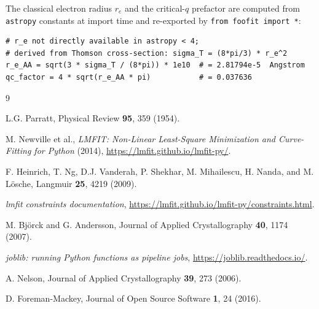 \documentclass[11pt,a4paper]{article}
\begin{document}
The classical electron radius $r_e$ and the critical-$q$ prefactor are computed from
\texttt{astropy} constants at import time and re-exported by \texttt{from foofit import *}:

\begin{verbatim}
# r_e not directly available in astropy < 4;
# derived from Thomson cross-section: sigma_T = (8*pi/3) * r_e^2
r_e_AA = sqrt(3 * sigma_T / (8*pi)) * 1e10  # = 2.81794e-5  Angstrom
qc_factor = 4 * sqrt(r_e_AA * pi)           # = 0.037636
\end{verbatim}

\begin{thebibliography}{9}

  L.G. Parratt,
  Physical Review \textbf{95}, 359 (1954).

  M. Newville et al.,
  \textit{LMFIT: Non-Linear Least-Square Minimization and Curve-Fitting for Python} (2014),
  \url{https://lmfit.github.io/lmfit-py/}.

  F. Heinrich, T. Ng, D.J. Vanderah, P. Shekhar, M. Mihailescu, H. Nanda, and M. L\"osche,
  Langmuir \textbf{25}, 4219 (2009).

  \textit{lmfit constraints documentation},
  \url{https://lmfit.github.io/lmfit-py/constraints.html}.

  M. Bj\"orck and G. Andersson,
  Journal of Applied Crystallography \textbf{40}, 1174 (2007).

  \textit{joblib: running Python functions as pipeline jobs},
  \url{https://joblib.readthedocs.io/}.

  A. Nelson,
  Journal of Applied Crystallography \textbf{39}, 273 (2006).

  D. Foreman-Mackey,
  Journal of Open Source Software \textbf{1}, 24 (2016).

\end{thebibliography}
\end{document}
